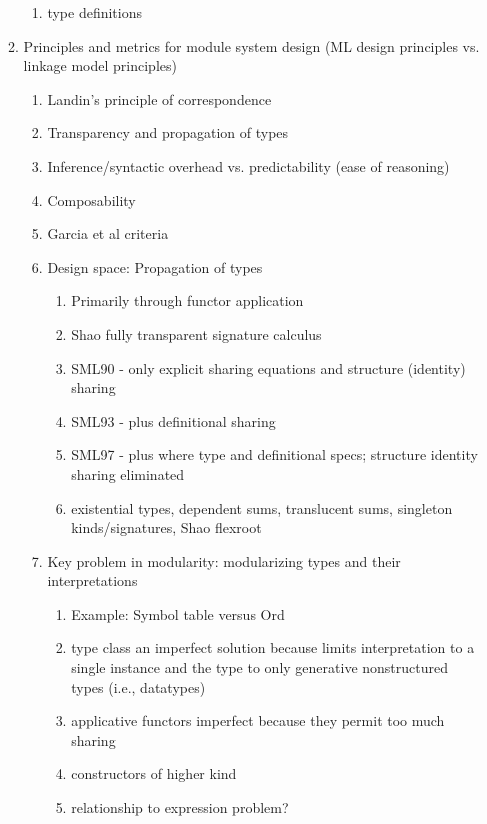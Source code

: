 \documentclass[12pt]{article}
\begin{document}
\begin{enumerate}
\begin{enumerate}
\begin{enumerate}
			\item type definitions
		\end{enumerate}		
		\item Principles and metrics for module system design (ML design principles vs. linkage model principles)
		\begin{enumerate}
			\item Landin's principle of correspondence
			\item Transparency and propagation of types
			\item Inference/syntactic overhead vs. predictability (ease of reasoning)
			\item Composability 
			\item Garcia et al criteria
			\item Design space: Propagation of types 
			\begin{enumerate}
				\item Primarily through functor application
				\item Shao fully transparent signature calculus
				\item SML90 - only explicit sharing equations and structure (identity) sharing 
				\item SML93 - plus definitional sharing
				\item SML97 - plus where type and definitional specs; structure identity sharing eliminated
				\item existential types, dependent sums, translucent sums, singleton kinds/signatures, Shao flexroot
			\end{enumerate}
			\item Key problem in modularity: modularizing types and their interpretations
			\begin{enumerate}
				\item Example: Symbol table versus Ord
				\item type class an imperfect solution because limits interpretation to a single instance and the type to only generative nonstructured types (i.e., datatypes)
				\item applicative functors imperfect because they permit too much sharing
				\item constructors of higher kind
				\item relationship to expression problem?
			\end{enumerate}	
					

\end{enumerate}
\end{enumerate}
\end{enumerate}
\end{document}
